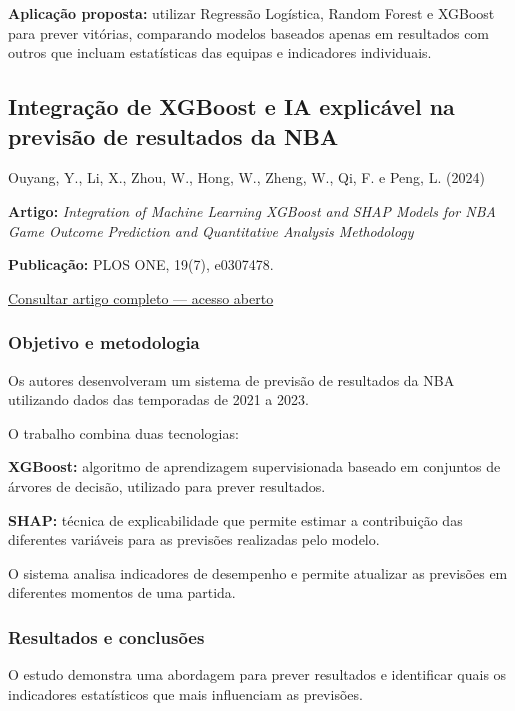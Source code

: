 \textbf{Aplicação proposta:} utilizar Regressão Logística, Random Forest e XGBoost para prever vitórias, comparando modelos baseados apenas em resultados com outros que incluam estatísticas das equipas e indicadores individuais.

\subsection{Integração de XGBoost e IA explicável na previsão de resultados da NBA}\label{aautia:integrauxe7uxe3o-de-xgboost-e-ia-explicuxe1vel-na-previsuxe3o-de-resultados-da-nba}

Ouyang, Y., Li, X., Zhou, W., Hong, W., Zheng, W., Qi, F. e Peng, L. (2024) \cite{ouyang2024}

\textbf{Artigo:} \emph{Integration of Machine Learning XGBoost and SHAP Models for NBA Game Outcome Prediction and Quantitative Analysis Methodology}

\textbf{Publicação:} PLOS ONE, 19(7), e0307478.

\href{https://doi.org/10.1371/journal.pone.0307478}{Consultar artigo completo --- acesso aberto}

\subsubsection{Objetivo e metodologia}\label{aautia:objetivo-e-metodologia-1}

Os autores desenvolveram um sistema de previsão de resultados da NBA utilizando dados das temporadas de 2021 a 2023.

O trabalho combina duas tecnologias:

\textbf{XGBoost:} algoritmo de aprendizagem supervisionada baseado em conjuntos de árvores de decisão, utilizado para prever resultados.

\textbf{SHAP:} técnica de explicabilidade que permite estimar a contribuição das diferentes variáveis para as previsões realizadas pelo modelo.

O sistema analisa indicadores de desempenho e permite atualizar as previsões em diferentes momentos de uma partida.

\subsubsection{Resultados e conclusões}\label{aautia:resultados-e-conclusuxf5es}

O estudo demonstra uma abordagem para prever resultados e identificar quais os indicadores estatísticos que mais influenciam as previsões.

